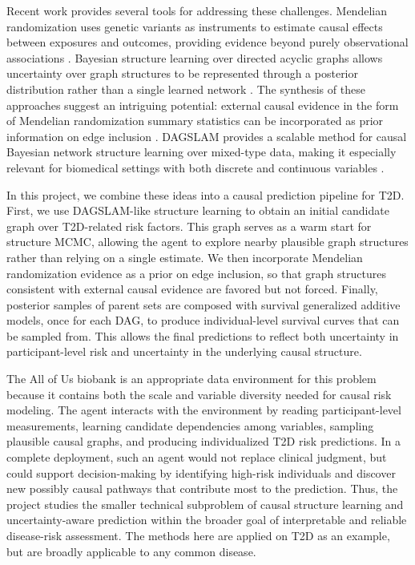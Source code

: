 \documentclass[11pt]{article}
\begin{document}
Recent work provides several tools for addressing these challenges. Mendelian randomization uses genetic variants as instruments to estimate causal effects between exposures and outcomes, providing evidence beyond purely observational associations \citep{DaveySmith2014, Pearl2009}. Bayesian structure learning over directed acyclic graphs allows uncertainty over graph structures to be represented through a posterior distribution rather than a single learned network \citep{MadiganYork1995, Kuipers2014}. The synthesis of these approaches suggest an intriguing potential: external causal evidence in the form of Mendelian randomization summary statistics can be incorporated as prior information on edge inclusion \citep{Zuber2025}. DAGSLAM provides a scalable method for causal Bayesian network structure learning over mixed-type data, making it especially relevant for biomedical settings with both discrete and continuous variables \citep{Zhao2025DAGSLAM}.

In this project, we combine these ideas into a causal prediction pipeline for T2D. First, we use DAGSLAM-like structure learning to obtain an initial candidate graph over T2D-related risk factors. This graph serves as a warm start for structure MCMC, allowing the agent to explore nearby plausible graph structures rather than relying on a single estimate. We then incorporate Mendelian randomization evidence as a prior on edge inclusion, so that graph structures consistent with external causal evidence are favored but not forced. Finally, posterior samples of parent sets are composed with survival generalized additive models, once for each DAG, to produce individual-level survival curves that can be sampled from. This allows the final predictions to reflect both uncertainty in participant-level risk and uncertainty in the underlying causal structure.

The All of Us biobank is an appropriate data environment for this problem because it contains both the scale and variable diversity needed for causal risk modeling. The agent interacts with the environment by reading participant-level measurements, learning candidate dependencies among variables, sampling plausible causal graphs, and producing individualized T2D risk predictions. In a complete deployment, such an agent would not replace clinical judgment, but could support decision-making by identifying high-risk individuals and discover new possibly causal pathways that contribute most to the prediction. Thus, the project studies the smaller technical subproblem of causal structure learning and uncertainty-aware prediction within the broader goal of interpretable and reliable disease-risk assessment. The methods here are applied on T2D as an example, but are broadly applicable to any common disease.
\end{document}
